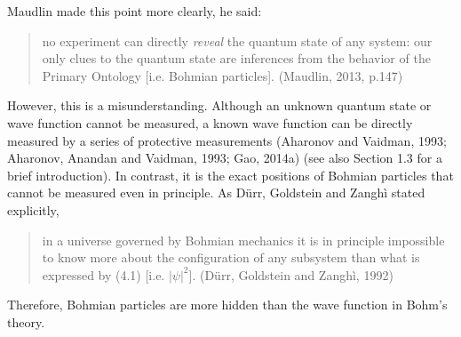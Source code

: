 \noindent Maudlin made this point more clearly, he said: 

\begin{quote}
no experiment can directly \emph{reveal} the quantum state of any system: our only clues to the quantum state are inferences from the behavior of the Primary Ontology [i.e. Bohmian particles]. (Maudlin, 2013, p.147)
\end{quote}

\noindent  However, this is a misunderstanding. Although an unknown quantum state or wave function cannot be measured, a known wave function can be directly measured by a series of protective measurements (Aharonov and Vaidman, 1993; Aharonov, Anandan and Vaidman, 1993; Gao, 2014a) (see also Section 1.3 for a brief introduction). 
In contrast,  it is the exact positions of Bohmian particles that cannot be measured even in principle. 
As D\"{u}rr, Goldstein and Zangh\`{i} stated explicitly, 

\begin{quote}
in a universe governed by Bohmian mechanics it is in principle impossible to know more about the configuration of any subsystem than what is expressed by (4.1) [i.e. $|\psi|^2$]. (D\"{u}rr, Goldstein and Zangh\`{i}, 1992)
\end{quote}

\noindent Therefore, Bohmian particles are more hidden than the wave function in Bohm's theory.

